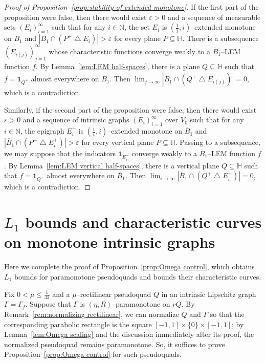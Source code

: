 \documentclass[11pt,reqno]{amsart}
\renewcommand{\H}{\mathbb{H}}
\newcommand{\N}{\mathbb{N}}
\renewcommand{\epsilon}{\varepsilon}
\newcommand{\0}{\mathbf{0}}
\renewcommand{\1}{\mathbf 1}
\newcommand{\one}{\mathbf{1}}
\newcommand{\symdiff}{\mathbin{\triangle}}
\renewcommand{\subset}{\subseteq}
\renewcommand{\le}{\leqslant}
\theoremstyle{remark}
\begin{document}
\begin{proof}[{Proof of Proposition~\ref{prop:stability of extended monotone}}]
  If the first part of the proposition were false, then there would exist  $\epsilon>0$ and a sequence of measurable sets $(E_i)_{i=1}^\infty$ such that for any $i\in \N$, the set $E_i$ is $(\frac{1}{i},i)$--extended monotone on $\overline{B}_1$ and $|\overline{B}_{1}\cap (P^+\symdiff E_i)|>\epsilon$ for every plane $P\subset \H$.  There is a subsequence $(E_{i(j)})_{j=1}^\infty$ whose characteristic functions converge weakly to a $\overline{B}_1$--LEM function $f$.  By Lemma~\ref{lem:LEM half-spaces}, there is a plane $Q\subset \H$ such that $f=\one_{Q^+}$ almost everywhere on $\overline{B}_1$.  Then $\lim_{j\to \infty} |\overline{B}_{1}\cap (Q^+\symdiff E_{i(j)})|= 0$, which is a contradiction.

  Similarly, if the second part of the proposition were false, then there would exist $\epsilon>0$ and a sequence of intrinsic graphs $(E_i)_{i=1}^\infty$ over $V_0$ such that for any $i\in \N$, the epigraph $E_i^+$ is $(\frac{1}{i},i)$--extended monotone on $\overline{B}_1$ and $|\overline{B}_{1}\cap (P^+\symdiff E_i^+)|>\epsilon$ for every vertical plane $P\subset \H$.  Passing to a subsequence, we may suppose that the indicators $\one_{E_i^+}$ converge weakly to a $\overline{B}_1$--LEM function $f$. By Lemma~\ref{lem:LEM vertical half-spaces}, there is a vertical plane $Q\subset \H$ such that $f=\one_{Q^+}$ almost everywhere on $\overline{B}_1$.  Then $\lim_{i\to \infty} |\overline{B}_{1}\cap (Q^+\symdiff E_i^+)|= 0$, which is a contradiction.
\end{proof}

\section{$L_1$ bounds and characteristic curves on monotone intrinsic graphs}\label{sec:l1 and characteristic}

Here we complete the proof of Proposition~\ref{prop:Omega control}, which obtains $L_1$ bounds for paramonotone pseudoquads and bounds their characteristic curves.

Fix $0<\mu\le \frac{1}{32}$ and a $\mu$--rectilinear pseudoquad  $Q$ in an intrinsic Lipschitz graph $\Gamma=\Gamma_f$. Suppose that $\Gamma$ is $(\eta, R)$--paramonotone on $rQ$.  By Remark~\ref{rem:normalizing rectilinear}, we can normalize $Q$ and $\Gamma$ so that the corresponding parabolic rectangle is the square $[-1,1]\times \{0\}\times [-1,1]$; by Lemma~\ref{lem:Omega scaling} and the discussion immediately after its proof, the normalized pseudoquad remains paramonotone.  So, it suffices to prove Proposition~\ref{prop:Omega control} for such pseudoquads.
\end{document}
